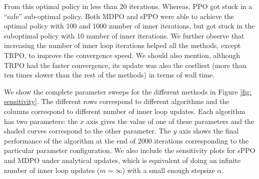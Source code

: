 \documentclass[a4paper, 10pt]{article}
\begin{document}
From this optimal policy in less than 20 iterations. Whereas, PPO got stuck in a ``safe'' sub-optimal policy. Both MDPO and sPPO were able to achieve the optimal policy with 100 and 1000 number of inner iterations, but got stuck in the suboptimal policy with 10 number of inner iterations. We further observe that increasing the number of inner loop iterations helped all the methods, except TRPO, to improve the convergence speed. We should also mention, although TRPO had the faster convergence, its update was also the costliest (more than ten times slower than the rest of the methods) in terms of wall time. 

We show the complete parameter sweeps for the different methods in Figure \ref{fig: sensitivity}. The different rows correspond to different algorithms and the columns correspond to different number of inner loop updates. Each algorithm has two parameters: the $x$ axis gives the value of one of these parameters and the shaded curves correspond to the other parameter. The $y$ axis shows the final performance of the algorithm at the end of 2000 iterations corresponding to the particular parameter configuration. We also include the sensitivity plots for sPPO and MDPO under analytical updates, which is equivalent of doing an infinite number of inner loop updates ($m = \infty$) with a small enough stepsize $\alpha$.
\end{document}
